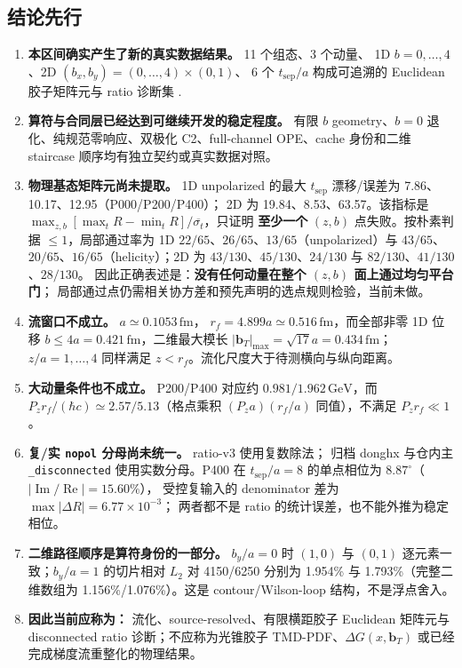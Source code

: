 \documentclass[UTF8]{ctexart}
\newcommand{\Real}{\operatorname{Re}}
\newcommand{\Imag}{\operatorname{Im}}
\newcommand{\bT}{\boldsymbol b_T}
\newcommand{\Pz}{P_z}
\newcommand{\ts}{t_{\mathrm{sep}}}
\begin{document}
\subsection{结论先行}

\begin{conclbox}
\begin{enumerate}
  \item \textbf{本区间确实产生了新的真实数据结果。} 11 个组态、3 个动量、
        1D \(b=0,\ldots,4\)、2D \((b_x,b_y)=(0,\ldots,4)\times(0,1)\)、
        6 个 \(\ts/a\) 构成可追溯的 Euclidean 胶子矩阵元与 ratio 诊断集
        \cite{local-log-all11}.
  \item \textbf{算符与合同层已经达到可继续开发的稳定程度。} 有限 \(b\)
        geometry、\(b=0\) 退化、纯规范零响应、双极化 C2、full-channel
        OPE、cache 身份和二维 staircase 顺序均有独立契约或真实数据对照。
  \item \textbf{物理基态矩阵元尚未提取。} 1D unpolarized 的最大
        \(\ts\) 漂移/误差为 7.86、10.17、12.95（P000/P200/P400）；
        2D 为 19.84、8.53、63.57。该指标是
        \(\max_{z,b}[\max_t R-\min_t R]/\overline{\sigma_t}\)，只证明
        \textbf{至少一个} \((z,b)\) 点失败。按朴素判据 \(\le1\)，局部通过率为
        1D \(22/65\)、\(26/65\)、\(13/65\)（unpolarized）与
        \(43/65\)、\(20/65\)、\(16/65\)（helicity）；2D 为
        \(43/130\)、\(45/130\)、\(24/130\) 与 \(82/130\)、\(41/130\)、\(28/130\)。
        因此正确表述是：\textbf{没有任何动量在整个 \((z,b)\) 面上通过均匀平台门}；
        局部通过点仍需相关协方差和预先声明的选点规则检验，当前未做。
  \item \textbf{流窗口不成立。} \(a\simeq0.1053\,\mathrm{fm}\)，
        \(r_f=4.899a\simeq0.516\,\mathrm{fm}\)，而全部非零 1D 位移
        \(b\le4a=0.421\,\mathrm{fm}\)，二维最大模长
        \(|\bT|_{\max}=\sqrt{17}a=0.434\,\mathrm{fm}\)；\(z/a=1,\ldots,4\)
        同样满足 \(z<r_f\)。流化尺度大于待测横向与纵向距离。
  \item \textbf{大动量条件也不成立。} P200/P400 对应约
        \(0.981/1.962\,\mathrm{GeV}\)，而
        \(\Pz r_f/(\hbar c)\simeq2.57/5.13\)（格点乘积
        \((\Pz a)(r_f/a)\) 同值），不满足 \(\Pz r_f\ll1\)。
  \item \textbf{复/实 \texttt{nopol} 分母尚未统一。} ratio-v3 使用复数除法；
        归档 donghx 与仓内主 \texttt{\_disconnected} 使用实数分母。P400 在
        \(\ts/a=8\) 的单点相位为 \(8.87^\circ\)（\(|\Imag/\Real|=15.60\%\)），
        受控复输入的 denominator 差为 \(\max|\Delta R|=6.77\times10^{-3}\)；
        两者都不是 ratio 的统计误差，也不能外推为稳定相位。
  \item \textbf{二维路径顺序是算符身份的一部分。} \(b_y/a=0\) 时
        \((1,0)\) 与 \((0,1)\) 逐元素一致；\(b_y/a=1\) 的切片相对 \(L_2\)
        对 4150/6250 分别为 1.954\% 与 1.793\%（完整二维数组为
        1.156\%/1.076\%）。这是 contour/Wilson-loop 结构，不是浮点舍入。
  \item \textbf{因此当前应称为：} 流化、source-resolved、有限横距胶子
        Euclidean 矩阵元与 disconnected ratio 诊断；不应称为光锥胶子
        TMD-PDF、\(\Delta G(x,\bT)\) 或已经完成梯度流重整化的物理结果。
\end{enumerate}
\end{conclbox}
\end{document}
